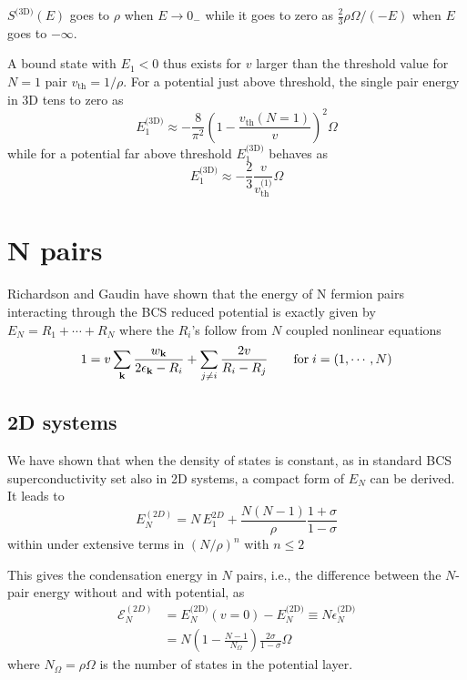 \documentclass{article}
\newcommand{\td}{{\ensuremath{{\text{(2D)}}}}}
\newcommand{\sd}{{\ensuremath{{\text{(3D)}}}}}
\begin{document}
$S^\sd(E)$ goes to $\rho$ when $E\rightarrow0_-$ while it goes to zero as $\frac{2}{3}\rho\Omega/(-E)$ when $E$ goes to $-\infty$. 

A bound state with $E_1<0$ thus exists for $v$ larger than the threshold value for $N=1$ pair $v_{\text{th}}=1/\rho$.  For a potential just above threshold, the single pair energy in 3D tens to zero as 
\begin{equation}
E_1^\sd\approx-\frac{8}{\pi^2}\left(1-\frac{v_{\text{th}}(N=1)}{v}\right)^2\Omega
\label{eq:}
\end{equation}
while for a potential far above threshold $E_1^\sd$ behaves as 
\begin{equation}
E_1^\sd\approx-\frac{2}{3}\frac{v}{v_\text{th}^{\text{(1)}}}\Omega
\label{eq:}
\end{equation}


\section{N pairs\label{sec:NPair}}
Richardson \cite{Richardson1} and Gaudin \cite{gaudin} have shown that the energy of N fermion pairs interacting through the BCS reduced potential is exactly given by $E_N=R_1+\cdots+R_N$ where the $R_i$'s follow from $N$ coupled nonlinear equations
\begin{equation}
 1=v\sum_{\mathbf{k}}\frac{w_{\mathbf{k}}}{2\epsilon_{\mathbf{k}}-R_i}+\sum_{j\neq{}i}\frac{2v}{R_i-R_j}\qquad\text{for}\;i=(1,\cdots,N)
\end{equation}
\subsection{2D systems}
We have shown that when the density of states is constant, as in standard BCS superconductivity set also in 2D systems, a compact form of $E_N$ can be derived. It leads to 
\begin{equation}
 E^(2D)_N=N\,E^{2D}_1+\frac{N(N-1)}{\rho}\frac{1+\sigma}{1-\sigma}
\end{equation}
within under extensive terms in $(N/\rho)^n$ with $n\leq2$

This gives the condensation energy in $N$ pairs, i.e., the difference between the $N$-pair energy without and with potential, as 
\begin{equation}\label{eq:E2D}
\begin{split}
 \mathcal{E}^{(2D)}_N&=E_N^{\td}(v=0)-E_N^\td\equiv{}N\epsilon_N^\td\\
&=N(1-\frac{N-1}{N_\Omega})\frac{2\sigma}{1-\sigma}\Omega
\end{split}
\end{equation}
where $N_\Omega=\rho\Omega$ is the number of states in the potential layer. 
\end{document}
